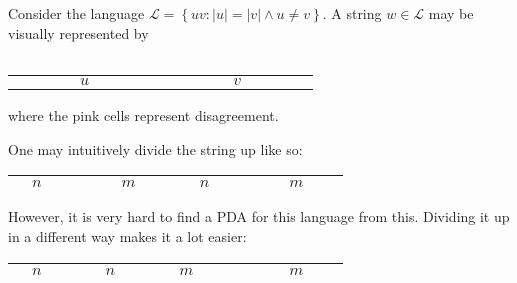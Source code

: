 \documentclass{notes}
\begin{document}
\begin{eg}
  Consider the language $\mathcal L = \left \{ u v : |u| = |v| \land u \neq v \right \}$.
  A string $w \in \mathcal L$ may be visually represented by 
  \begin{center}
    \begin{tabular}{|ccccccccc|ccccccccc|}
      \hline
      \phantom{x} & \phantom{$n$} & \phantom{x} & \cellcolor{pink} & \phantom{$u$} & \phantom{x} & \phantom{$m$} & \phantom{x} & \phantom{x} & \phantom{x} & \phantom{$n$} & \phantom{$x$} & \cellcolor{pink} & \phantom{$v$} & \phantom{x} & \phantom{$m$} & \phantom{x} & \phantom{x} \\ 
      \hline
    \end{tabular}
    
    \begin{tabular}{cccccccccccccccccc}
      \phantom{$x$} & \phantom{$n$} & \phantom{$x$} & \phantom{$x$} & $u$ & \phantom{$x$} & \phantom{$m$} & \phantom{$x$} & \phantom{$x$} & \phantom{$x$} & \phantom{$n$} & \phantom{$x$} & \phantom{$x$} & $v$ & \phantom{$x$} & \phantom{$m$} & \phantom{$x$} & \phantom{$x$}
    \end{tabular}
  \end{center}
  where the pink cells represent disagreement.
  
  One may intuitively divide the string up like so: 
  \begin{center}
    \begin{tabular}{|ccccccccc|ccccccccc|}
      \hline
      \phantom{$x$} & $n$ & \phantom{$x$} & \cellcolor{pink} & \phantom{$u$} & \phantom{$x$} & $m$ & \phantom{$x$} & \phantom{$x$} & \phantom{$x$} & $n$ & \phantom{$x$} & \cellcolor{pink} & \phantom{$v$} & \phantom{$x$} & $m$ & \phantom{$x$} & \phantom{$x$} \\ 
      \hline
    \end{tabular}
  \end{center}
  
  However, it is very hard to find a PDA for this language from this.
  Dividing it up in a different way makes it a lot easier: 
  \begin{center}
    \begin{tabular}{|ccccccc|ccccccccccc|}
      \hline
      \phantom{$x$} & $n$ & \phantom{$x$} & \cellcolor{pink} & \phantom{$u$} & $n$ & \phantom{$m$} & \phantom{$x$} & \phantom{$x$} & $m$ & \phantom{$x$} & \phantom{$x$} & \cellcolor{pink} & \phantom{$v$} & \phantom{$x$} & $m$ & \phantom{$x$} & \phantom{$x$} \\ 
      \hline
    \end{tabular}
  \end{center}
  

\end{eg}
\end{document}
